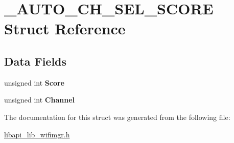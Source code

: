 \hypertarget{struct__AUTO__CH__SEL__SCORE}{}\section{\+\_\+\+A\+U\+T\+O\+\_\+\+C\+H\+\_\+\+S\+E\+L\+\_\+\+S\+C\+O\+RE Struct Reference}
\label{struct__AUTO__CH__SEL__SCORE}
\subsection*{Data Fields}
\begin{DoxyCompactItemize}
\item 
\mbox{\label{struct__AUTO__CH__SEL__SCORE_a5d747cf4b5cfdf1ad3b187a01501a47b}} 
unsigned int {\bfseries Score}
\item 
\mbox{\label{struct__AUTO__CH__SEL__SCORE_a9355b31a7eab1fc7812dc47c26648d39}} 
unsigned int {\bfseries Channel}
\end{DoxyCompactItemize}


The documentation for this struct was generated from the following file\+:\begin{DoxyCompactItemize}
\item 
\hyperlink{libapi__lib__wifimgr_8h}{libapi\+\_\+lib\+\_\+wifimgr.\+h}\end{DoxyCompactItemize}
